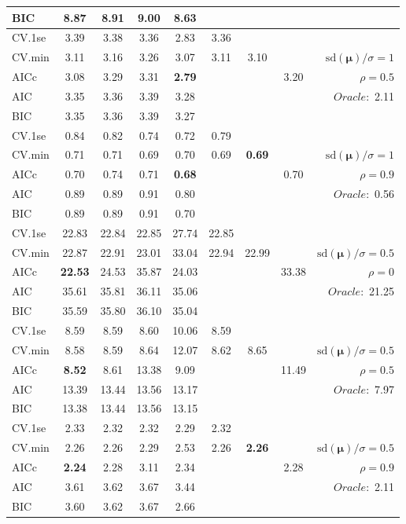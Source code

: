 \begin{table}
\begin{center}
\begin{tabular}{l*{7}{c}|r}
BIC & 8.87 & 8.91 & 9.00 & 8.63 & & & &  \\
 \hline 
CV.1se & 3.39 & 3.38 & 3.36 & 2.83 & 3.36 & & & \\
CV.min & 3.11 & 3.16 & 3.26 & 3.07 & 3.11 & 3.10 & & $\mathrm{sd}(\mathbf{\mu})/\sigma=1$ \\
AICc & 3.08 & 3.29 & 3.31 & {\bf 2.79} & & & 3.20 &  $\rho=0.5$ \\
AIC & 3.35 & 3.36 & 3.39 & 3.28 & & & &  \multirow{2}{*}{$Oracle: $ 2.11} \\
BIC & 3.35 & 3.36 & 3.39 & 3.27 & & & &  \\
 \hline 
CV.1se & 0.84 & 0.82 & 0.74 & 0.72 & 0.79 & & & \\
CV.min & 0.71 & 0.71 & 0.69 & 0.70 & 0.69 & {\bf 0.69} & & $\mathrm{sd}(\mathbf{\mu})/\sigma=1$ \\
AICc & 0.70 & 0.74 & 0.71 & {\bf 0.68} & & & 0.70 &  $\rho=0.9$ \\
AIC & 0.89 & 0.89 & 0.91 & 0.80 & & & &  \multirow{2}{*}{$Oracle: $ 0.56} \\
BIC & 0.89 & 0.89 & 0.91 & 0.70 & & & &  \\
 \hline 
CV.1se & 22.83 & 22.84 & 22.85 & 27.74 & 22.85 & & & \\
CV.min & 22.87 & 22.91 & 23.01 & 33.04 & 22.94 & 22.99 & & $\mathrm{sd}(\mathbf{\mu})/\sigma=0.5$ \\
AICc & {\bf 22.53} & 24.53 & 35.87 & 24.03 & & & 33.38 &  $\rho=0$ \\
AIC & 35.61 & 35.81 & 36.11 & 35.06 & & & &  \multirow{2}{*}{$Oracle: $ 21.25} \\
BIC & 35.59 & 35.80 & 36.10 & 35.04 & & & &  \\
 \hline 
CV.1se & 8.59 & 8.59 & 8.60 & 10.06 & 8.59 & & & \\
CV.min & 8.58 & 8.59 & 8.64 & 12.07 & 8.62 & 8.65 & & $\mathrm{sd}(\mathbf{\mu})/\sigma=0.5$ \\
AICc & {\bf 8.52} & 8.61 & 13.38 & 9.09 & & & 11.49 &  $\rho=0.5$ \\
AIC & 13.39 & 13.44 & 13.56 & 13.17 & & & &  \multirow{2}{*}{$Oracle: $ 7.97} \\
BIC & 13.38 & 13.44 & 13.56 & 13.15 & & & &  \\
 \hline 
CV.1se & 2.33 & 2.32 & 2.32 & 2.29 & 2.32 & & & \\
CV.min & 2.26 & 2.26 & 2.29 & 2.53 & 2.26 & {\bf 2.26} & & $\mathrm{sd}(\mathbf{\mu})/\sigma=0.5$ \\
AICc & {\bf 2.24} & 2.28 & 3.11 & 2.34 & & & 2.28 &  $\rho=0.9$ \\
AIC & 3.61 & 3.62 & 3.67 & 3.44 & & & &  \multirow{2}{*}{$Oracle: $ 2.11} \\
BIC & 3.60 & 3.62 & 3.67 & 2.66 & & & &  \\
 \hline 
\end{tabular}
\end{center}
\vspace{-1cm}
\end{table}





